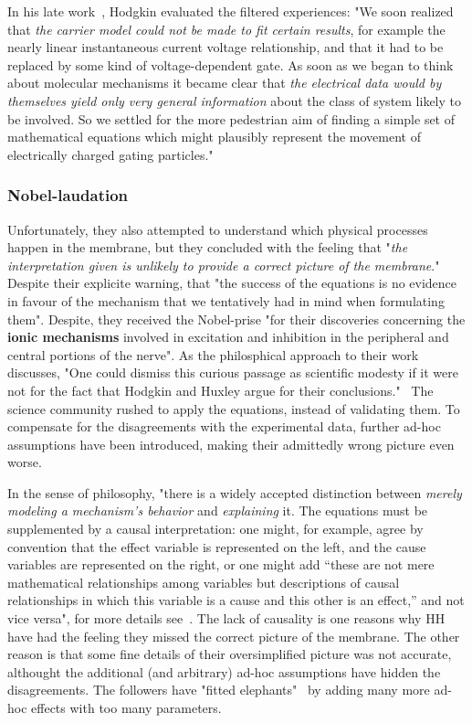 In his late work~\cite{HodgkinMemoryBook:1992}, Hodgkin evaluated the filtered experiences:
"We soon realized that \textit{the carrier model could not be made to fit certain results},
for example the nearly linear instantaneous current voltage relationship, and
that it had to be replaced by some kind of voltage-dependent gate. As soon as
we began to think about molecular mechanisms it became clear that
\textit{the electrical data would by themselves yield only very general information} about the class
of system likely to be involved. So we settled for the more pedestrian aim of
finding a simple set of mathematical equations which might plausibly represent
the movement of electrically charged gating particles."


\subsubsection{Nobel-laudation\label{sec:Physiology-HodgkinHuxleyNobel}}

Unfortunately, they also attempted to understand which physical processes happen in the membrane,
but they concluded with the feeling that "\textit{the interpretation given is unlikely to provide a correct picture of the membrane}."
Despite their explicite warning, that "the success of the equations is no evidence in
favour of the mechanism that we tentatively had in
mind when formulating them". 
Despite, they received the Nobel-prise "for their discoveries concerning the
\textbf{ionic mechanisms} involved in excitation and inhibition in the peripheral and central portions of the nerve".
As the philosphical approach to their work discusses, "One could dismiss this curious passage as scientific modesty
if it were not for the fact
that Hodgkin and Huxley argue for their conclusions."~\cite{MechanisticModelHodgkinHuxleyCraver:2006}
The science community rushed to apply the equations, instead of validating them.
To compensate for the disagreements with the experimental data, further ad-hoc
assumptions have been introduced, making their admittedly wrong picture even worse.

In the sense of philosophy, "there is a widely accepted distinction between
\textit{merely modeling a mechanism’s behavior} and \textit{explaining} it.
The equations
must be supplemented by a causal interpretation: one might, for example, agree by
convention that the effect variable is represented on the left, and the cause variables
are represented on the right, or one might add “these are not mere mathematical
relationships among variables but descriptions of causal relationships in which this
variable is a cause and this other is an effect,” and not vice versa",
for more details see~\cite{MechanisticModelHodgkinHuxleyCraver:2006,Mechanistic_HodgkinHuxley_2008}.
The lack of causality is one reasons why
HH have had the feeling they missed the correct picture of the membrane.
The other reason is that some fine details of their oversimplified picture was not accurate,
althought the additional (and arbitrary) ad-hoc assumptions have hidden the disagreements.
The followers have "fitted elephants"~\cite{FittingElephants:2021} by adding many more ad-hoc effects with too many parameters.

